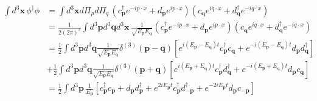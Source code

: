 \documentclass[a4paper,11pt]{article}
\begin{document}
\begin{align}
    \int d^3\mathbf{x}\, \phi^\dagger\phi
    &= \int d^3\mathbf{x} d\Pi_p d\Pi_q\, \left(c_{\mathbf{p}}^\dagger e^{-ip\cdot x} + d_{\mathbf{p}} e^{ip\cdot x}\right)\left(c_{\mathbf{q}} e^{iq\cdot x} + d_{\mathbf{q}}^\dagger e^{-iq\cdot x}\right) \\
    &=\frac{1}{2(2\pi)^3}\int d^3\mathbf{p}d^3\mathbf{q}d^3\mathbf{x}\, \frac{1}{\sqrt{E_{\mathbf{p}}E_{\mathbf{q}}}} \left(c_{\mathbf{p}}^\dagger e^{-ip\cdot x} + d_{\mathbf{p}} e^{ip\cdot x}\right)\left(c_{\mathbf{q}} e^{iq\cdot x} + d_{\mathbf{q}}^\dagger e^{-iq\cdot x}\right) \\
    &=\frac{1}{2}\int d^3\mathbf{p}d^3\mathbf{q} \frac{1}{\sqrt{E_{\mathbf{p}}E_{\mathbf{q}}}} \delta^{(3)}(\mathbf{p}-\mathbf{q})\left[e^{i(E_{\mathbf{p}}-E_{\mathbf{q}})t}c_{\mathbf{p}}^\dagger c_{\mathbf{q}} + e^{-i(E_{\mathbf{p}}-E_{\mathbf{q}})t}d_{\mathbf{p}} d_{\mathbf{q}}^\dagger\right] \\
    &+\frac{1}{2}\int d^3\mathbf{p}d^3\mathbf{q} \frac{1}{\sqrt{E_{\mathbf{p}}E_{\mathbf{q}}}} \delta^{(3)}(\mathbf{p}+\mathbf{q})\left[e^{i(E_{\mathbf{p}}+E_{\mathbf{q}})t}c_{\mathbf{p}}^\dagger d_{\mathbf{q}}^\dagger + e^{-i(E_{\mathbf{p}}+E_{\mathbf{q}})t}d_{\mathbf{p}}c_{\mathbf{q}}\right] \\
    &=\frac{1}{2}\int d^3\mathbf{p}\, \frac{1}{E_{\mathbf{p}}}\left[c_{\mathbf{p}}^\dagger c_{\mathbf{p}} + d_{\mathbf{p}} d_{\mathbf{p}}^\dagger + e^{2iE_{\mathbf{p}}t}c_{\mathbf{p}}^\dagger d_{-\mathbf{p}}^\dagger + e^{-2iE_{\mathbf{p}}t}d_{\mathbf{p}}c_{-\mathbf{p}}\right]  
\end{align}
\end{document}
